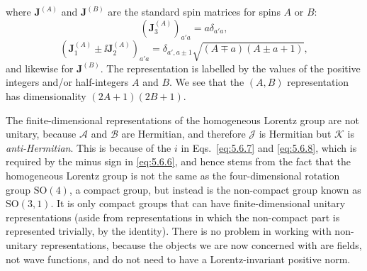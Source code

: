 where $\mathbf J^{(A)}$ and $\mathbf J^{(B)}$ are the standard spin matrices
for spins $A$ or $B$:
\begin{equation}
(\mathbf J_3^{(A)})_{a'a}=a\delta_{a'a},
\tag{5.6.16}\label{eq:5.6.16}
\end{equation}
\begin{equation}
(\mathbf J_1^{(A)}\mathbin{\pm}\ii\mathbf J_2^{(A)})_{a'a}
=\delta_{a',a\pm1}\sqrt{(A\mp a)(A\pm a+1)},
\tag{5.6.17}\label{eq:5.6.17}
\end{equation}
and likewise for $\mathbf J^{(B)}$. The representation is labelled by the
values of the positive integers and/or half-integers $A$ and $B$. We see that
the $(A,B)$ representation has dimensionality $(2A+1)(2B+1)$.

The finite-dimensional representations of the homogeneous Lorentz group are
not unitary, because $\mathcal{A}$ and $\mathcal{B}$ are Hermitian, and
therefore $\mathcal{J}$ is Hermitian but $\mathcal{K}$ is
\emph{anti-Hermitian}. This is because of the $i$ in Eqs.~\eqref{eq:5.6.7} and \eqref{eq:5.6.8},
which is required by the minus sign in \eqref{eq:5.6.6}, and hence stems from the fact
that the homogeneous Lorentz group is not the same as the four-dimensional
rotation group $\mathrm{SO}(4)$, a compact group, but instead is the
non-compact group known as $\mathrm{SO}(3,1)$. It is only compact groups that
can have finite-dimensional unitary representations (aside from
representations in which the non-compact part is represented trivially, by the
identity). There is no problem in working with non-unitary representations,
because the objects we are now concerned with are fields, not wave functions,
and do not need to have a Lorentz-invariant positive norm.

